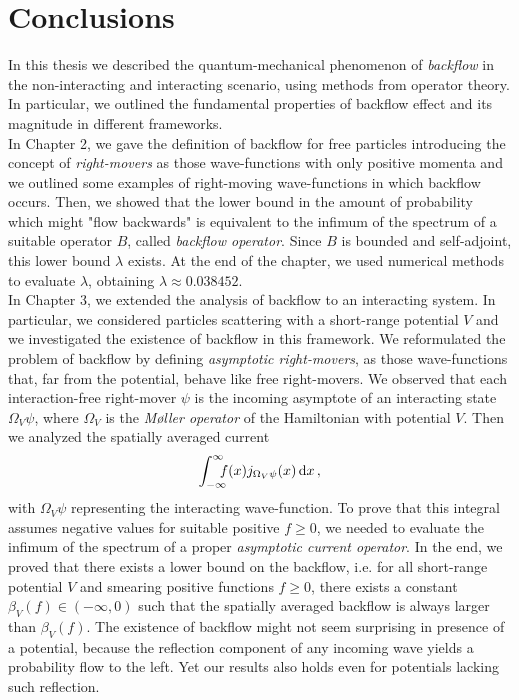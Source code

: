 \chapter{Conclusions}
\label{conclusion}

In this thesis we described the quantum-mechanical phenomenon of \textit{backflow} in the non-interacting and interacting scenario, using methods from operator theory. In particular, we outlined the fundamental properties of backflow effect and its magnitude in different frameworks.\\
In Chapter 2, we gave the definition of backflow for free particles introducing the concept of \textit{right-movers} as those wave-functions with only positive momenta and we outlined some examples of right-moving wave-functions in which backflow occurs. Then, we showed that the lower bound in the amount of probability which might "flow backwards" is equivalent to the infimum of the spectrum of a suitable operator $B$, called \textit{backflow operator}. Since $B$ is bounded and self-adjoint, this lower bound $\lambda$ exists. At the end of the chapter, we used  numerical methods to evaluate $\lambda$, obtaining $\lambda\approx0.038452$.\\
In Chapter 3, we extended the analysis of backflow to an interacting system. In particular, we considered particles scattering with a short-range potential $V$ and we investigated the existence of backflow in this framework. We reformulated the problem of backflow by defining \textit{asymptotic right-movers}, as those wave-functions that, far from the potential, behave like free right-movers. We observed that each interaction-free right-mover $\psi$ is the incoming asymptote of an interacting state $\Omega_V\psi$, where $\Omega_V$ is the \textit{M\o{}ller operator} of the Hamiltonian with potential $V$. Then we analyzed the spatially averaged current
\begin{equation*}
	\int_{-\infty}^{\infty}\!\!\!\!f(x)j_{\Omega_V\psi}(x)\,\mathrm d x\,,
\end{equation*}
with $\Omega_V\psi$ representing the interacting wave-function. To prove that this integral assumes negative values for suitable positive $f\ge0$, we needed to evaluate the infimum of the spectrum of a proper \textit{asymptotic current operator}. In the end, we proved that there exists a lower bound on the backflow, i.e. for all short-range potential $V$ and smearing positive functions $f\ge0$, there exists a constant $\beta_V(f)\in(-\infty,0)$ such that the spatially averaged backflow is always larger than $\beta_V(f)$. The existence of backflow might not seem surprising in presence of a potential, because the reflection component of any incoming wave yields a probability flow to the left. Yet our results also holds even for potentials lacking such reflection.\\
